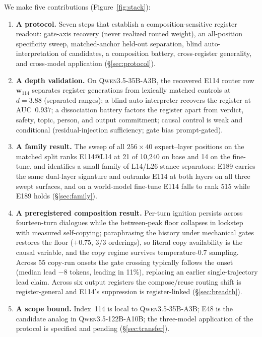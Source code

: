 \documentclass[10pt,a4paper,twocolumn]{article}
\newcommand{\wvec}{\mathbf{w}_{114}}
\begin{document}
We make five contributions (Figure~\ref{fig:stack}):
\begin{enumerate}[leftmargin=*,nosep]
\item \textbf{A protocol.} Seven steps that establish a composition-sensitive
register readout: gate-axis recovery (never realized routed weight), an
all-position specificity sweep, matched-anchor held-out separation, blind
auto-interpretation of candidates, a composition battery, cross-register
generality, and cross-model application (\S\ref{sec:protocol}).
\item \textbf{A depth validation.} On \textsc{Qwen3.5-35B-A3B}, the recovered
E114 router row $\wvec$ separates register generations from lexically matched
controls at $d{=}3.88$ (separated ranges); a blind auto-interpreter recovers
the register at AUC~$0.937$; a dissociation battery factors the register apart
from verdict, safety, topic, person, and output commitment; causal control is
weak and conditional (residual-injection sufficiency; gate bias prompt-gated).
\item \textbf{A family result.} The sweep of all $256{\times}40$ expert--layer
positions on the matched split ranks E114@L14 at 21 of 10{,}240 on base and 14
on the fine-tune, and identifies a small family of L14/L26 stance separators:
E189 carries the same dual-layer signature and outranks E114 at both layers on
all three swept surfaces, and on a world-model fine-tune E114 falls to rank
515 while E189 holds (\S\ref{sec:family}).
\item \textbf{A preregistered composition result.} Per-turn ignition persists
across fourteen-turn dialogues while the between-peak floor collapses in
lockstep with measured self-copying; paraphrasing the history under mechanical
gates restores the floor ($+0.75$, 3/3 orderings), so literal copy
availability is the causal variable, and the copy regime survives
temperature-$0.7$ sampling. Across 55 copy-run onsets the gate crossing
typically follows the onset (median lead $-8$ tokens, leading in 11\%),
replacing an earlier single-trajectory lead claim. Across six output
registers the compose/reuse routing shift is register-general and E114's
suppression is register-linked (\S\ref{sec:breadth}).
\item \textbf{A scope bound.} Index~114 is local to
\textsc{Qwen3.5-35B-A3B}; E48 is the candidate analog in
\textsc{Qwen3.5-122B-A10B}; the three-model application of the protocol is
specified and pending (\S\ref{sec:transfer}).
\end{enumerate}
\end{document}
